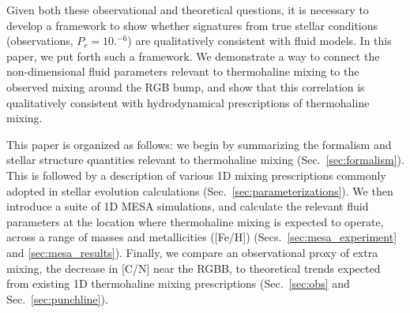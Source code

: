 Given both these observational and theoretical questions, it is necessary to develop a framework to show whether signatures from true stellar conditions (observations, $P_r = 10.^{-6}$) are qualitatively consistent with fluid models. %
In this paper, we put forth such a framework. 
We demonstrate a way to connect the non-dimensional fluid parameters relevant to thermohaline mixing to the observed mixing around the RGB bump, and show that this correlation is qualitatively consistent with hydrodynamical prescriptions of thermohaline mixing. %

This paper is organized as follows: we begin by summarizing the formalism and stellar structure quantities relevant to thermohaline mixing (Sec.~\ref{sec:formalism}). This is followed by a description of various 1D mixing prescriptions commonly adopted in stellar evolution calculations (Sec.~\ref{sec:parameterizations}). %
We then introduce a suite of 1D MESA simulations, and calculate the relevant fluid parameters at the location where thermohaline mixing is expected to operate, across a range of masses and metallicities ([Fe/H])  (Secs.~\ref{sec:mesa_experiment} and \ref{sec:mesa_results}). 
Finally, we compare an observational proxy of extra mixing, the decrease in [C/N] near the RGBB, to theoretical trends expected from existing 1D thermohaline mixing prescriptions (Sec.~\ref{sec:obs} and Sec.~\ref{sec:punchline}). 
